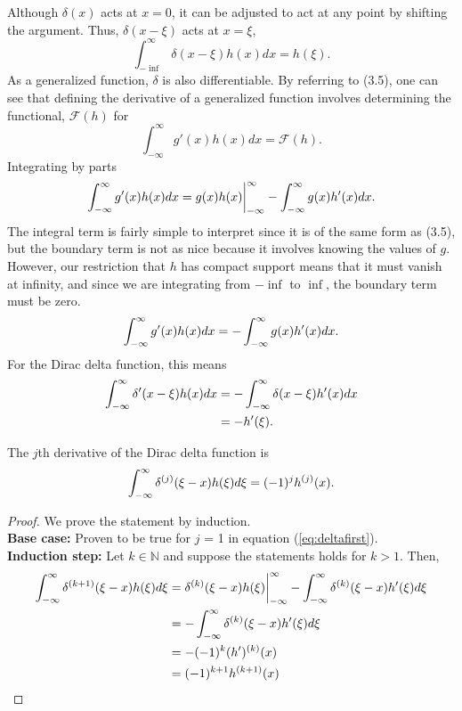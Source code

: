 Although \(\delta(x)\) acts at \(x=0\), it can be adjusted to act at any point by shifting the argument. Thus, \(\delta(x-\xi)\) acts at \(x=\xi\),
\begin{equation}
    \int_{-\inf}^{\infty} \delta(x-\xi)h(x)dx = h(\xi).
\end{equation}
As a generalized function, \(\delta\) is also differentiable. By referring to (3.5), one can see that defining the derivative of a generalized function involves determining the functional, \(\mathcal{F}(h)\) for
\begin{equation}
    \int_{-\infty}^{\infty} g'(x)h(x) dx= \mathcal{F}(h).
\end{equation}
Integrating by parts
\begin{equation}
    \int_{-\infty}^{\infty} g'(x)h(x)dx = g(x)h(x)\biggr\rvert_{-\infty}^{\infty} - \int_{-\infty}^{\infty} g(x)h'(x)dx.
\end{equation}
The integral term is fairly simple to interpret since it is of the same form as (3.5), but the boundary term is not as nice because it involves knowing the values of \(g\). However, our restriction that \(h\) has compact support means that it must vanish at infinity, and since we are integrating from \(-\inf\) to \(\inf\), the boundary term must be zero.
\begin{equation}
    \int_{-\infty}^{\infty} g'(x)h(x)dx = -\int_{-\infty}^{\infty} g(x)h'(x)dx.
\end{equation}
For the Dirac delta function, this means
\begin{equation}
    \begin{split} \label{eq:deltafirst}
        \int_{-\infty}^{\infty} \delta'(x-\xi)h(x)dx &= -\int_{-\infty}^{\infty}\delta(x-\xi)h'(x)dx\\
        &=-h'(\xi).
    \end{split}
\end{equation}


\begin{theorem} \label{th:deltad}
    The \(j\)th derivative of the Dirac delta function is
    \begin{equation}
         \int_{-\infty}^{\infty} \delta^{(j)}(\xi-x)h(\xi)d\xi = (-1)^jh^{(j)}(x).
    \end{equation}
\end{theorem}
\begin{proof} We prove the statement by induction.\\
    \textbf{Base case:} Proven to be true for \(j\) = 1 in equation (\ref{eq:deltafirst}).\\
    \textbf{Induction step:} Let \(k \in \mathbb{N}\) and suppose the statements holds for \(k>1\). Then,
    \begin{align*}
        \int_{-\infty}^{\infty} \delta^{(k+1)}(\xi-x)h(\xi)d\xi &= \delta^{(k)}(\xi-x)h(\xi)\biggr\rvert_{-\infty}^{\infty}-\int_{-\infty}^{\infty} \delta^{(k)}(\xi-x)h'(\xi)d\xi\\
        &=-\int_{-\infty}^{\infty} \delta^{(k)}(\xi-x)h'(\xi)d\xi\\
        &=-(-1)^{k}(h')^{(k)}(x)\\
        &=(-1)^{k+1}h^{(k+1)}(x)
    \end{align*}
\end{proof}

